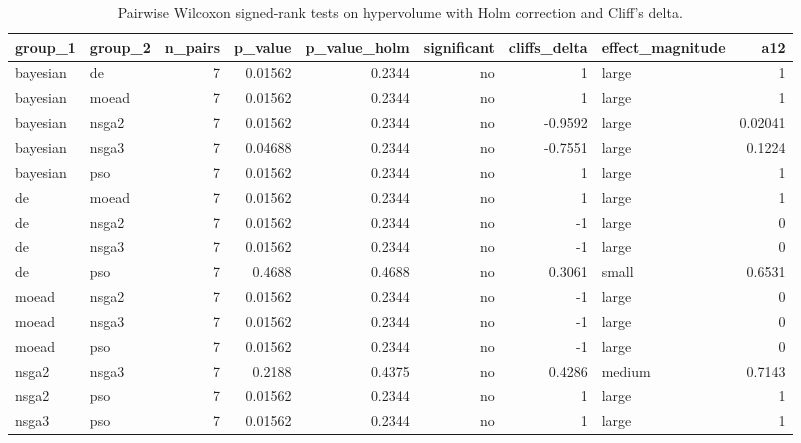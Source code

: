 \begin{table}[!t]
\centering
\caption{Pairwise Wilcoxon signed-rank tests on hypervolume with Holm correction and Cliff's delta.}
\label{tab:statistics_optimizer_pairwise_hypervolume_main}
\footnotesize
\begin{tabular}{llrrrrrlr}
\toprule
group\_1 & group\_2 & n\_pairs & p\_value & p\_value\_holm & significant & cliffs\_delta & effect\_magnitude & a12 \\
\midrule
bayesian & de & 7 & 0.01562 & 0.2344 & no & 1 & large & 1 \\
bayesian & moead & 7 & 0.01562 & 0.2344 & no & 1 & large & 1 \\
bayesian & nsga2 & 7 & 0.01562 & 0.2344 & no & -0.9592 & large & 0.02041 \\
bayesian & nsga3 & 7 & 0.04688 & 0.2344 & no & -0.7551 & large & 0.1224 \\
bayesian & pso & 7 & 0.01562 & 0.2344 & no & 1 & large & 1 \\
de & moead & 7 & 0.01562 & 0.2344 & no & 1 & large & 1 \\
de & nsga2 & 7 & 0.01562 & 0.2344 & no & -1 & large & 0 \\
de & nsga3 & 7 & 0.01562 & 0.2344 & no & -1 & large & 0 \\
de & pso & 7 & 0.4688 & 0.4688 & no & 0.3061 & small & 0.6531 \\
moead & nsga2 & 7 & 0.01562 & 0.2344 & no & -1 & large & 0 \\
moead & nsga3 & 7 & 0.01562 & 0.2344 & no & -1 & large & 0 \\
moead & pso & 7 & 0.01562 & 0.2344 & no & -1 & large & 0 \\
nsga2 & nsga3 & 7 & 0.2188 & 0.4375 & no & 0.4286 & medium & 0.7143 \\
nsga2 & pso & 7 & 0.01562 & 0.2344 & no & 1 & large & 1 \\
nsga3 & pso & 7 & 0.01562 & 0.2344 & no & 1 & large & 1 \\
\bottomrule
\end{tabular}
\end{table}
